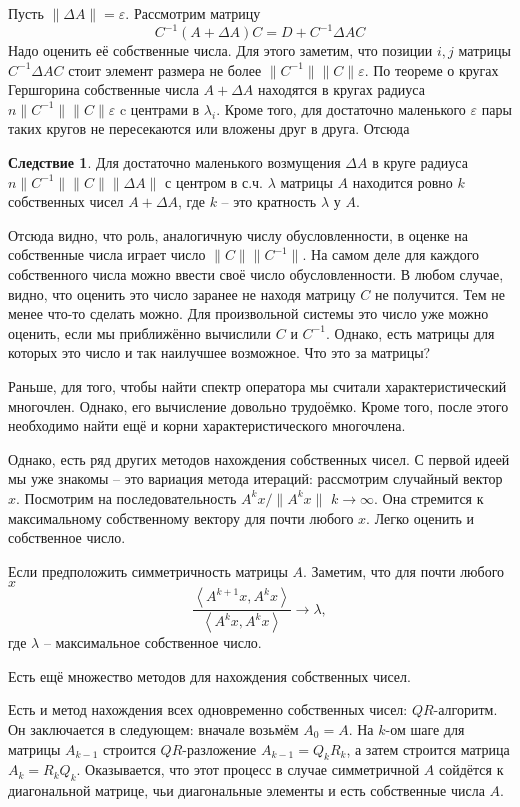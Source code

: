 \documentclass[12pt,a4paper,oneside]{book}
\theoremstyle{definition}
\newtheorem{cor}{\color{green!45!black}Следствие}
\def\eps{\varepsilon}
\def\lan{\left\langle }
\def\ran{\right\rangle}
\def\crl{\begin{cor}}
\def\ecrl{\end{cor}}
\begin{document}
Пусть $\| \Delta A\|=\eps$. Рассмотрим матрицу
$$C^{-1}(A+\Delta A) C= D+C^{-1}\Delta A C $$
Надо оценить её собственные числа. Для этого заметим, что позиции  $i,j$ матрицы $C^{-1}\Delta A C$ стоит элемент размера не более $\| C^{-1}\| \|C\| \eps$. По теореме о кругах Гершгорина собственные числа $A+\Delta A$ находятся в кругах радиуса $n \| C^{-1}\| \|C\| \eps $ c центрами в $\lambda_i$. Кроме того, для достаточно маленького $\eps$ пары таких кругов не пересекаются или вложены друг в друга. Отсюда

\crl Для достаточно маленького возмущения $\Delta A$ в круге радиуса  $n \| C^{-1}\| \|C\| \|\Delta A\|$ с центром в с.ч.  $\lambda$ матрицы $A$ находится ровно $k$ собственных чисел $A+\Delta A$, где $k$ -- это кратность $\lambda$ у $A$.
\ecrl

Отсюда видно, что  роль, аналогичную числу обусловленности, в оценке на собственные числа играет число $\|C\|\|C^{-1}\|$. На самом деле для каждого собственного числа можно ввести своё число обусловленности. В любом случае, видно, что оценить это число заранее не находя матрицу $C$ не получится. Тем не менее что-то сделать можно. Для произвольной системы это число уже можно оценить, если мы приближённо вычислили $C$ и $C^{-1}$. Однако, есть матрицы для которых это число и так наилучшее возможное. Что это за матрицы?


Раньше, для того, чтобы найти спектр оператора мы считали характеристический многочлен. Однако, его вычисление довольно трудоёмко. Кроме того, после этого необходимо найти ещё и корни характеристического многочлена.


Однако, есть ряд других методов нахождения собственных чисел. С первой идеей мы уже знакомы -- это вариация метода итераций: рассмотрим случайный вектор $x$. Посмотрим на последовательность $A^kx/\|A^kx\|$ $k\to \infty$. Она стремится к максимальному собственному вектору для почти любого $x$. Легко оценить и собственное число.

Если предположить симметричность матрицы $A$. Заметим, что  для почти любого $x$ 
$$\frac {\lan A^{k+1}x, A^k x \ran}{\lan A^k x, A^k x \ran} \to \lambda, $$
где $\lambda$ -- максимальное собственное число.

Есть ещё множество методов для нахождения собственных чисел. 

Есть и метод нахождения всех одновременно собственных чисел: $QR$-алгоритм. Он заключается в следующем: вначале возьмём $A_0=A$. На $k$-ом шаге для матрицы $A_{k-1}$ строится $QR$-разложение $A_{k-1}=Q_kR_k$, а затем строится матрица $A_k=R_kQ_k$. Оказывается, что этот процесс в случае симметричной $A$ сойдётся к диагональной матрице, чьи диагональные элементы  и есть собственные числа $A$. 
\end{document}
